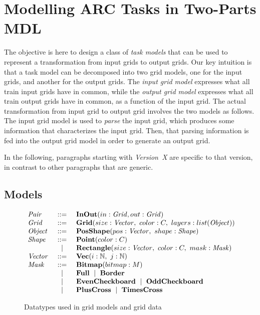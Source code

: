 \documentclass[a4paper]{llncs}
\newenvironment{datatype}{$\begin{array}{lcl}}{\end{array}$}
\newcommand{\is}{&\ ::=\ &}
\newcommand{\alter}{\ \mid\ }
\newcommand{\altis}{\\ &\ \mid\ &}
\newcommand{\nat}{\mathbb{N}}
\begin{document}
\section{Modelling ARC Tasks in Two-Parts MDL}
\label{modelling}

The objective is here to design a class of {\em task models} that can
be used to represent a transformation from input grids to output
grids.
%
Our key intuition is that a task model can be decomposed into two grid
models, one for the input grids, and another for the output grids. The
{\em input grid model} expresses what all train input grids have in
common, while the {\em output grid model} expresses what all train
output grids have in common, as a function of the input grid.
%
The actual transformation from input grid to output grid involves the
two models as follows. The input grid model is used to {\em parse} the
input grid, which produces some information that characterizes the
input grid. Then, that parsing information is fed into the output grid
model in order to generate an output grid.

In the following, paragraphs starting with {\em Version~X} are
specific to that version, in contrast to other paragraphs that are
generic.

\subsection{Models}
\label{model}

\begin{figure}[t]
\begin{center}
\begin{datatype}
  {\it Pair} \is {\bf InOut}(in: {\it Grid}, out: {\it Grid})
  \\
  {\it Grid} \is {\bf Grid}(size: {\it Vector},\ color: C,\ layers: list({\it Object}))
  \\
  {\it Object} \is {\bf PosShape}(pos: {\it Vector},\ shape: {\it Shape})
  \\
  {\it Shape} \is {\bf Point}(color: C)
  \altis {\bf Rectangle}(size: {\it Vector},\ color: C,\ mask: {\it Mask})
  \\
  {\it Vector} \is {\bf Vec}(i: \nat,\ j: \nat)
  \\
  {\it Mask} \is {\bf Bitmap}(bitmap: M)
  \altis {\bf Full} \alter {\bf Border}
  \altis {\bf EvenCheckboard} \alter {\bf OddCheckboard}
  \altis {\bf PlusCross} \alter {\bf TimesCross}
\end{datatype}
\end{center}
\caption{Datatypes used in grid models and grid data}
\label{fig:patterns}
\end{figure}
\end{document}
